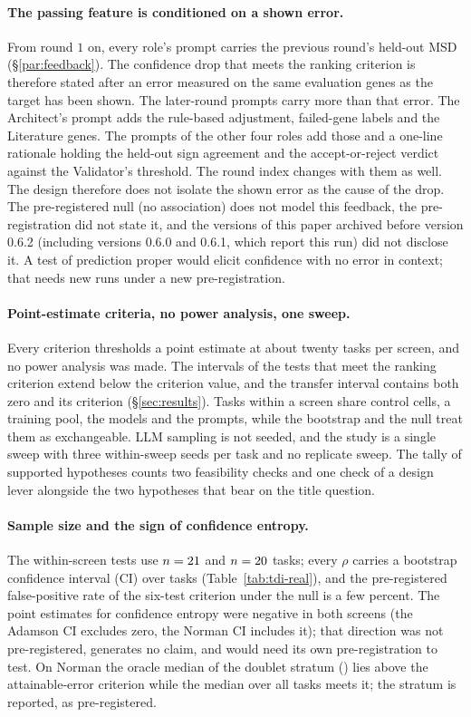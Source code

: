 \documentclass[10pt,a4paper]{article}
\begin{document}
\paragraph{The passing feature is conditioned on a shown error.} From round $1$ on,
every role's prompt carries the previous round's held-out MSD (\S\ref{par:feedback}).
The confidence drop that meets the ranking criterion is therefore stated after an
error measured on the same evaluation genes as the target has been shown. The
later-round prompts carry more than that error. The Architect's prompt adds the
rule-based adjustment, failed-gene labels and the Literature genes. The prompts of the
other four roles add those and a one-line rationale holding the held-out sign
agreement and the accept-or-reject verdict against the Validator's threshold. The
round index changes with them as well. The design therefore does not isolate the
shown error as the cause of the drop. The pre-registered null (no association) does
not model this feedback, the pre-registration did not state it, and the versions of
this paper archived before version 0.6.2 (including versions 0.6.0 and 0.6.1, which report
this run) did not disclose it. A test of prediction
proper would elicit confidence with no error in context; that needs new runs under a
new pre-registration.

\paragraph{Point-estimate criteria, no power analysis, one sweep.} Every criterion
thresholds a point estimate at about twenty tasks per screen, and no power analysis
was made. The intervals of the tests that meet the ranking criterion extend below
the criterion value, and the transfer interval contains both zero and its criterion
(\S\ref{sec:results}). Tasks within a screen share control cells, a training pool,
the models and the prompts, while the bootstrap and the null treat them as
exchangeable. LLM sampling is not seeded, and the study is a single sweep with
three within-sweep seeds per task and no replicate sweep. The tally of supported
hypotheses counts two feasibility checks and one check of a design lever alongside
the two hypotheses that bear on the title question.

\paragraph{Sample size and the sign of confidence entropy.} The within-screen tests
use $n=21$ and $n=20$ tasks; every $\rho$ carries a
bootstrap confidence interval (CI) over tasks (Table~\ref{tab:tdi-real}), and the pre-registered
false-positive rate of the six-test criterion under the null is a few percent. The
point estimates for confidence entropy were negative in both screens (the Adamson CI
excludes zero, the Norman CI includes it); that direction was not pre-registered,
generates no claim, and would need its own pre-registration to test. On Norman the
oracle median of the doublet stratum (\resHTwoDoubletMedian) lies above the
attainable-error criterion while the median over all tasks meets it; the stratum is
reported, as pre-registered.
\end{document}
